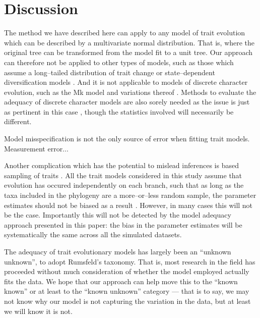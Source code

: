 \documentclass[12pt]{article}
\begin{document}
\section{Discussion}

The method we have described here can apply to any model of trait evolution which can be described by a multivariate normal distribution. That is, where the original tree can be transformed from the model fit to a unit tree. Our approach can therefore not be applied to other types of models, such as those which assume a long--tailed distribution of trait change \citep[e.g.][]{Landis2012} or state--dependent diversification models \citep[e.g.][]{Bokma2008, Bokma2010, FitzJohn2010}. And it is not applicable to models of discrete character evolution, such as the Mk model \citep{Pagel1994, Lewis2001} and variations thereof \citep[e.g.][]{Maddison2007, WagnerMarcot2010, Mazeralli2012, Beaulieu2013} \citep[but see Felsenstein's threshold model;][]{Felsenstein2005, Felsenstein2012}. Methods to evaluate the adequacy of discrete character models are also sorely needed as the issue is just as pertinent in this case \citep{ReadNee, MaddisonFitzJohn}, though the statistics involved will necessarily be different.

Model misspecification is not the only source of error when fitting trait models. Measurement error...

Another complication which has the potential to mislead inferences is based sampling of traits \citep{Freckletoninaction, longeuroname, FitzJohnwoody}. All the trait models considered in this study assume that evolution has occured independently on each branch, such that as long as the taxa included in the phylogeny are a more--or--less random sample, the parameter estimates should not be biased as a result \citep{PennellHarmon}. However, in many cases \citep[especially when using large trait databases][]{FitzJohnwoody} this will not be the case. Importantly this will not be detected by the model adequacy approach presented in this paper: the bias in the parameter estimates will be systematically the same across all the simulated datasets.

The adequacy of trait evolutionary models has largely been an ``unknown unknown'', to adopt Rumsfeld's taxonomy. That is, most research in the field has proceeded without much consideration of whether the model employed actually fits the data. We hope that our approach can help move this to the ``known known'' or at least to the ``known unknown'' category --- that is to say, we may not know why our model is not capturing the variation in the data, but at least we will know it is not.
\end{document}
